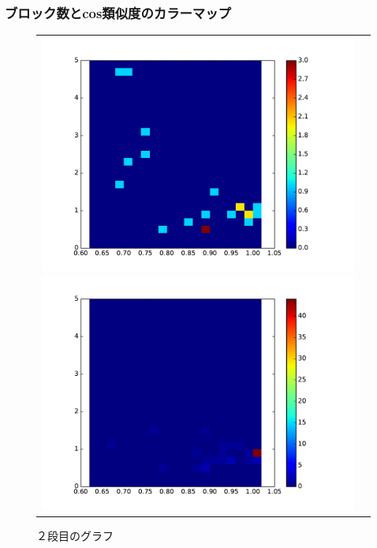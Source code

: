 \documentclass[twocolumn,9pt,a4paper]{jsarticle}
\begin{document}
 \subsubsection{ブロック数とcos類似度のカラーマップ}
\begin{figure}[h]
 \begin{tabular}{cc}
 	\begin{minipage}[t]{0.45\hsize}
	 \centering
	 \includegraphics[keepaspectratio, scale = 0.2]{colormap_maze_block_1.pdf}
	 \caption{１段目のグラフ}
	 \label{first_splite}
	\end{minipage}
        \begin{minipage}[t]{0.45\hsize}
	 \centering
	 \includegraphics[keepaspectratio, scale = 0.2]{colormap_maze_block_2.pdf}
	 \caption{２段目のグラフ}
	 \label{second_splite}
	\end{minipage}
 \end{tabular}
 \end{figure}
\end{document}
